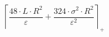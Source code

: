 \[\left\lceil \frac{48 \cdot L \cdot R^{2}}{\varepsilon} + \frac{324 \cdot \sigma^{2} \cdot R^{2}}{\varepsilon^{2}} \right\rceil_{+}\]
